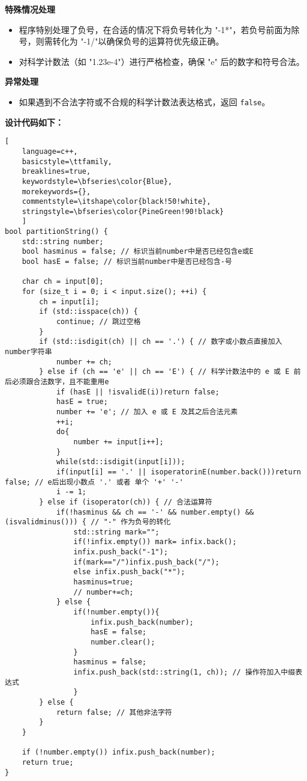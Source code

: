 \documentclass[UTF8]{ctexart}
\begin{document}
\textbf{特殊情况处理}
\begin{itemize}
    \item 程序特别处理了负号，在合适的情况下将负号转化为 "-1*"，若负号前面为除号，则需转化为 "-1/"以确保负号的运算符优先级正确。
    \item 对科学计数法（如 "1.23e-4"）进行严格检查，确保 "e" 后的数字和符号合法。
\end{itemize}

\textbf{异常处理}
\begin{itemize}
    \item 如果遇到不合法字符或不合规的科学计数法表达格式，返回 \texttt{false}。
\end{itemize}

\textbf{设计代码如下：}

\begin{lstlisting}[ 
    language=c++,
    basicstyle=\ttfamily,
    breaklines=true,
    keywordstyle=\bfseries\color{Blue}, 
    morekeywords={}, 
    commentstyle=\itshape\color{black!50!white},
    stringstyle=\bfseries\color{PineGreen!90!black} 
    ]
bool partitionString() {
    std::string number;
    bool hasminus = false; // 标识当前number中是否已经包含e或E
    bool hasE = false; // 标识当前number中是否已经包含-号

    char ch = input[0];
    for (size_t i = 0; i < input.size(); ++i) {
        ch = input[i];
        if (std::isspace(ch)) {
            continue; // 跳过空格
        }
        if (std::isdigit(ch) || ch == '.') { // 数字或小数点直接加入number字符串
            number += ch;
        } else if (ch == 'e' || ch == 'E') { // 科学计数法中的 e 或 E 前后必须跟合法数字，且不能重用e
            if (hasE || !isvalidE(i))return false;
            hasE = true;
            number += 'e'; // 加入 e 或 E 及其之后合法元素
            ++i;
            do{
                number += input[i++];
            }
            while(std::isdigit(input[i]));
            if(input[i] == '.' || isoperatorinE(number.back()))return false; // e后出现小数点 '.' 或者 单个 '+' '-'
            i -= 1;
        } else if (isoperator(ch)) { // 合法运算符
            if(!hasminus && ch == '-' && number.empty() && (isvalidminus())) { // "-" 作为负号的转化
                std::string mark="";
                if(!infix.empty()) mark= infix.back();
                infix.push_back("-1");
                if(mark=="/")infix.push_back("/");
                else infix.push_back("*");
                hasminus=true;
                // number+=ch;
            } else {
                if(!number.empty()){
                    infix.push_back(number);
                    hasE = false;
                    number.clear();
                }
                hasminus = false;
                infix.push_back(std::string(1, ch)); // 操作符加入中缀表达式
                } 
        } else {
            return false; // 其他非法字符
        }
    }

    if (!number.empty()) infix.push_back(number);
    return true;
}
\end{lstlisting}
\end{document}
